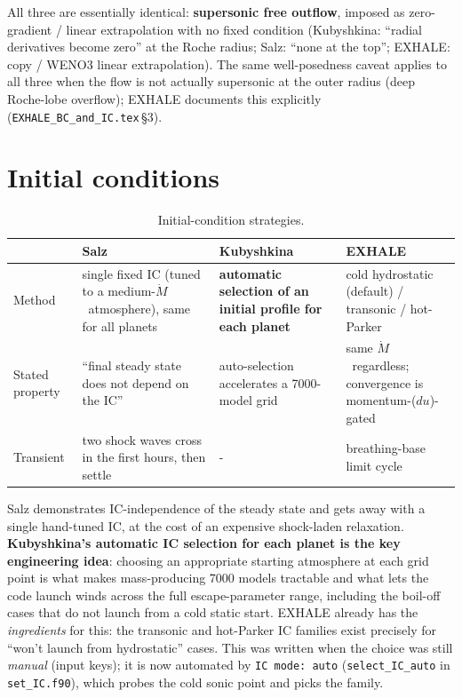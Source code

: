 \documentclass[english,a4paper]{my_memo}
\newcommand{\Mdot}{$\dot M$}
\begin{document}
All three are essentially identical: \textbf{supersonic free outflow},
imposed as zero-gradient / linear extrapolation with no fixed condition
(Kubyshkina: ``radial derivatives become zero'' at the Roche radius;
Salz: ``none at the top''; EXHALE: copy / WENO3 linear extrapolation).
The same well-posedness caveat applies to all three when the flow is not
actually supersonic at the outer radius (deep Roche-lobe overflow);
EXHALE documents this explicitly (\texttt{EXHALE\_BC\_and\_IC.tex}\,\S3).

\section{Initial conditions}

\begin{table}[h]
\centering\small
\begin{tabular}{@{}p{}p{}p{}p{}@{}}
\toprule
 & Salz & Kubyshkina & EXHALE \\
\midrule
Method & single fixed IC (tuned to a medium-\Mdot\ atmosphere), same for all planets & \textbf{automatic selection of an initial profile for each planet} & cold hydrostatic (default) / transonic / hot-Parker \\
Stated property & ``final steady state does not depend on the IC'' & auto-selection accelerates a 7000-model grid & same \Mdot\ regardless; convergence is momentum-($du$)-gated \\
Transient & two shock waves cross in the first hours, then settle & - & breathing-base limit cycle \\
\bottomrule
\end{tabular}
\caption{Initial-condition strategies.}
\end{table}

Salz demonstrates IC-independence of the steady state and gets away with
a single hand-tuned IC, at the cost of an expensive shock-laden
relaxation. \textbf{Kubyshkina's automatic IC selection for each planet is
the key engineering idea}: choosing an appropriate starting atmosphere
at each grid point is what makes mass-producing 7000 models tractable
and what lets the code launch winds across the full escape-parameter
range, including the boil-off cases that do not launch from a cold
static start. EXHALE already has the \emph{ingredients} for this: the
transonic and hot-Parker IC families exist precisely for ``won't launch
from hydrostatic'' cases. This was written when the choice was still
\emph{manual} (input keys); it is now automated by \texttt{IC mode: auto}
(\texttt{select\_IC\_auto} in \texttt{set\_IC.f90}), which probes the cold
sonic point and picks the family.
\end{document}
